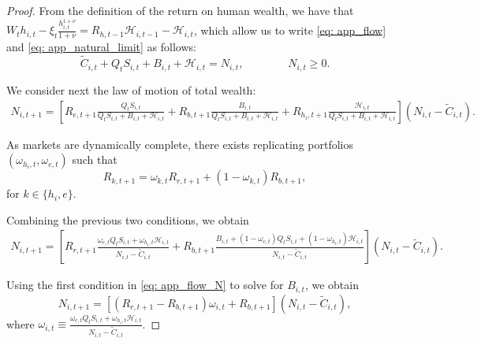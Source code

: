 \begin{proof}
    From the definition of the return on human wealth, we have that $W_t h_{i,t} -\xi_t \frac{h_{i,t}^{1+\nu}}{1+\nu} = R_{h,t-1} \mathcal{H}_{i,t-1} - \mathcal{H}_{i,t}$, which allow us to write \eqref{eq: app_flow} and \eqref{eq: app_natural_limit} as follows:
    \begin{equation}\label{eq: app_flow_N}
        \tilde{C}_{i,t} + Q_t S_{i,t} + B_{i,t} + \mathcal{H}_{i,t} = N_{i,t}, \qquad \qquad N_{i,t} \geq 0.
    \end{equation}
    
    We consider next the law of motion of total wealth:\small
    \begin{align}
        N_{i,t+1} =\left[ R_{e,t+1} \frac{Q_{t} S_{i,t}}{Q_{t} S_{i,t}+B_{i,t}+\mathcal{H}_{i,t}} + R_{b,t+1} \frac{B_{i,t}}{Q_{t} S_{i,t}+B_{i,t}+\mathcal{H}_{i,t}}+ R_{h_i,t+1} \frac{\mathcal{H}_{i,t}}{Q_{t} S_{i,t}+B_{i,t}+\mathcal{H}_{i,t}}\right] \left( N_{i,t} -\tilde{C}_{i,t}\right).
    \end{align}\normalsize
    
    As markets are dynamically complete, there exists replicating portfolios $(\omega_{h_i,t}, \omega_{e,t})$ such that 
    \begin{equation}
        R_{k,t+1} = \omega_{k,t} R_{r,t+1} + (1-\omega_{k,t}) R_{b,t+1},
    \end{equation}
    for $k\in\{h_i,e\}$.
    
    Combining the previous two conditions, we obtain\small
    \begin{align}
        N_{i,t+1} =\left[ R_{r,t+1} \frac{\omega_{e,t} Q_{t} S_{i,t}+\omega_{h_i,t} \mathcal{H}_{i,t}}{N_{i,t}-\tilde{C}_{i,t}} + R_{b,t+1} \frac{B_{i,t}+(1-\omega_{e,t}) Q_t S_{i,t}+(1-\omega_{h_i,t}) \mathcal{H}_{i,t}}{N_{i,t}-\tilde{C}_{i,t}}\right] \left( N_{i,t} -\tilde{C}_{i,t}\right).
    \end{align}\normalsize
    
    Using the first condition in \eqref{eq: app_flow_N} to solve for $B_{i,t}$, we obtain
    \begin{equation}
        N_{i,t+1} =\left[ \left(R_{r,t+1} - R_{b,t+1}\right) \omega_{i,t} + R_{b,t+1} \right] \left( N_{i,t} -\tilde{C}_{i,t}\right),
    \end{equation}
    where $\omega_{i,t} \equiv \frac{\omega_{e,t} Q_{t} S_{i,t}+\omega_{h_i,t} \mathcal{H}_{i,t}}{N_{i,t}-\tilde{C}_{i,t}}$.
    
    
    
    \end{proof}

